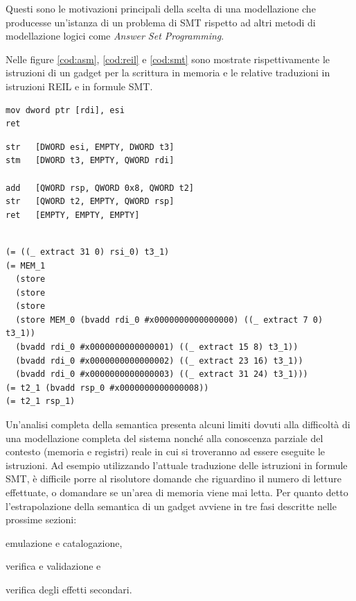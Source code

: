 Questi sono le motivazioni principali della scelta di una modellazione
che producesse un'istanza di un problema di SMT rispetto ad altri
metodi di modellazione logici come \emph{Answer Set Programming}.

Nelle figure \ref{cod:asm}, \ref{cod:reil} e \ref{cod:smt} sono
mostrate rispettivamente le istruzioni di un gadget per la scrittura
in memoria e le relative traduzioni in istruzioni REIL e in formule
SMT.

\begin{lstlisting}[caption=gadget per la scrittura in memoria, label=cod:asm]
mov dword ptr [rdi], esi
ret
\end{lstlisting}

\begin{lstlisting}[caption=traduzione del gadget in fig. \ref{cod:asm}
    nel linguaggio intermedio REIL, label=cod:reil]
str   [DWORD esi, EMPTY, DWORD t3]
stm   [DWORD t3, EMPTY, QWORD rdi]

add   [QWORD rsp, QWORD 0x8, QWORD t2]
str   [QWORD t2, EMPTY, QWORD rsp]
ret   [EMPTY, EMPTY, EMPTY]
\end{lstlisting}

\begin{lstlisting}[caption=traduzione del gadget in fig. \ref{cod:asm}
    in formule SMT, label=cod:smt]

(= ((_ extract 31 0) rsi_0) t3_1)
(= MEM_1 
  (store 
  (store 
  (store 
  (store MEM_0 (bvadd rdi_0 #x0000000000000000) ((_ extract 7 0) t3_1)) 
  (bvadd rdi_0 #x0000000000000001) ((_ extract 15 8) t3_1))
  (bvadd rdi_0 #x0000000000000002) ((_ extract 23 16) t3_1))
  (bvadd rdi_0 #x0000000000000003) ((_ extract 31 24) t3_1)))
(= t2_1 (bvadd rsp_0 #x0000000000000008))
(= t2_1 rsp_1)
\end{lstlisting}

Un'analisi completa della semantica presenta alcuni limiti dovuti alla
difficoltà di una modellazione completa del sistema nonché alla
conoscenza parziale del contesto (memoria e registri) reale in cui si
troveranno ad essere eseguite le istruzioni. Ad esempio utilizzando
l'attuale traduzione delle istruzioni in formule SMT, è difficile
porre al risolutore domande che riguardino il numero di letture
effettuate, o domandare se un'area di memoria viene mai letta. Per
quanto detto l'estrapolazione della semantica di un gadget avviene in
tre fasi descritte nelle prossime sezioni:
\begin{inparaenum}[a)]
\item emulazione e catalogazione, 
\item verifica e validazione e 
\item verifica degli effetti secondari.
\end{inparaenum}



